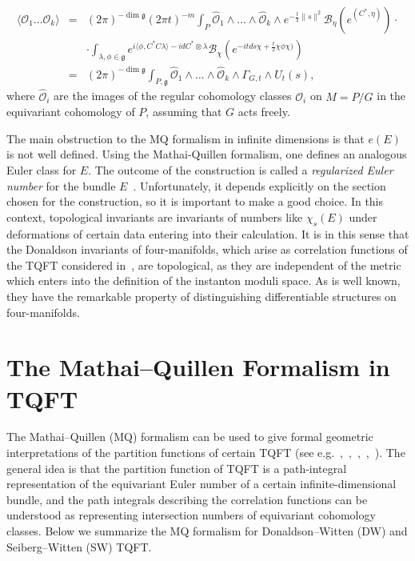 \documentclass[a4paper,12pt,reqno,sumlimits]{amsart}
\theoremstyle{plain}
\theoremstyle{definition}
\newcommand{\1}{{\bf 1}}
\newcommand{\g}{{\mathfrak  g}}
\newcommand{\ex}[1]{{e^{#1}}}
\newcommand{\calB}{{\mathcal B}}
\newcommand{\calO}{{\mathcal O}}
\newcommand{\ip}[1]{\langle #1 \rangle}
\newcommand{\norm}[1]{\| #1 \|}
\numberwithin{equation}{section}
\begin{document}
\begin{eqnarray*}
  \ip{\calO_1\dots\calO_k}&=&(2\pi)^{-\dim\g}(2\pi t)^{-m}
  \int_P\hat{\calO}_1\wedge\dots\wedge\hat{\calO}_k\wedge
  \ex{-\frac{t}{2}\norm{s}^2}\calB_\eta\left(\ex{(C^*,\eta)}\right)\cdot\\
  &&\cdot\int_{\lambda,\phi\in\g}
  \ex{i\ip{\phi,C^*C\lambda}-idC^*\otimes\lambda}
  \calB_\chi\left(\ex{-itds\chi+\frac{t}{2}\chi\phi\chi)}\right)\\
  &=&(2\pi)^{-\dim\g}\int_{P,\g}\hat{\calO}_1\wedge\dots\wedge\hat{\calO}_k\wedge
  \Gamma_{G,t}\wedge U_t(s),
\end{eqnarray*}
where $\hat{\calO}_i$ are the images of the regular cohomology classes $\calO_i$ on
$M=P/G$ in the equivariant cohomology of $P$, assuming that $G$ acts freely.

The main obstruction to the MQ formalism in infinite dimensions is that
$e(E)$ is not well defined. Using the Mathai-Quillen formalism, one defines
an analogous Euler class for $E$.  The outcome of the construction is called
a {\em regularized Euler number} for the bundle $E$~\cite{aj}.
Unfortunately, it depends explicitly on the section chosen for the
construction, so it is important to make a good choice. In this context,
topological invariants are invariants of numbers like $\chi_s(E)$ under
deformations of certain data entering into their calculation. It is in this
sense that the Donaldson invariants of four-manifolds, which arise as
correlation functions of the TQFT considered in~\cite{ewdon}, are
topological, as they are independent of the metric which enters into the
definition of the instanton moduli space. As is well known, they have the
remarkable property of distinguishing differentiable structures on
four-manifolds.



\section{The Mathai--Quillen Formalism in TQFT} 
\label{mq_tqft}

The Mathai--Quillen (MQ) formalism can be used to give formal geometric
interpretations of the partition functions of certain TQFT (see
e.g.~\cite{radu},~\cite{labastida_marino3},~\cite{labastida_marino4},~\cite{marino},~\cite{wu}).
The general idea is that the partition function of TQFT is a path-integral
representation of the equivariant Euler number of a certain
infinite-dimensional bundle, and the path integrals describing the
correlation functions can be understood as representing intersection numbers
of equivariant cohomology classes.  Below we summarize the MQ formalism for
Donaldson--Witten (DW) and Seiberg--Witten (SW) TQFT.
\end{document}
